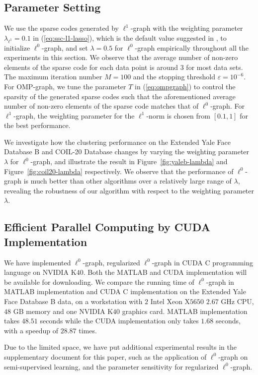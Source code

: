 \documentclass[10pt,twocolumn,letterpaper]{article}
\begin{document}
\subsection{Parameter Setting}
We use the sparse codes generated by $\ell^{1}$-graph with the weighting parameter $\lambda_{\ell^{1}} = 0.1$ in (\ref{eq:ssc-l1-lasso}), which is the default value suggested in \cite{ElhamifarV13}, to initialize $\ell^{0}$-graph, and set $\lambda=0.5$ for $\ell^{0}$-graph empirically throughout all the experiments in this section. We observe that the average number of non-zero elements of the sparse code for each data point is around $3$ for most data sets. The maximum iteration number $M = 100$ and the stopping threshold $\varepsilon = 10^{-6}$. For OMP-graph, we tune the parameter $T$ in (\ref{eq:ompgraph}) to control the sparsity of the generated sparse codes such that the aforementioned average number of non-zero elements of the sparse code matches that of $\ell^{0}$-graph. For $\ell^{1}$-graph, the weighting parameter for the $\ell^{1}$-norm is chosen from $[0.1,1]$ for the best performance.

We investigate how the clustering performance on the Extended Yale Face Database B and COIL-20 Database changes by varying the weighting parameter $\lambda$ for $\ell^{0}$-graph, and illustrate the result in Figure~\ref{fig:yaleb-lambda} and Figure~\ref{fig:coil20-lambda} respectively. We observe that the performance of $\ell^{0}$-graph is much better than other algorithms over a relatively large range of $\lambda$, revealing the robustness of our algorithm with respect to the weighting parameter $\lambda$.

\subsection{Efficient Parallel Computing by CUDA Implementation}
We have implemented $\ell^{0}$-graph, regularized $\ell^{0}$-graph in CUDA C programming language on NVIDIA K$40$. Both the MATLAB and CUDA implementation will be available for downloading. We compare the running time of $\ell^{0}$-graph in MATLAB implementation and CUDA C implementation on the Extended Yale Face Database B data, on a workstation with $2$ Intel Xeon X$5650$ $2.67$ GHz CPU, $48$ GB memory and one NVIDIA K$40$ graphics card. MATLAB implementation takes $48.51$ seconds while the CUDA implementation only takes $1.68$ seconds, with a speedup of $28.87$ times.

Due to the limited space, we have put additional experimental results in the supplementary document for this paper, such as the application of $\ell^{0}$-graph on semi-supervised learning, and the parameter sensitivity for regularized $\ell^{0}$-graph.
\end{document}

